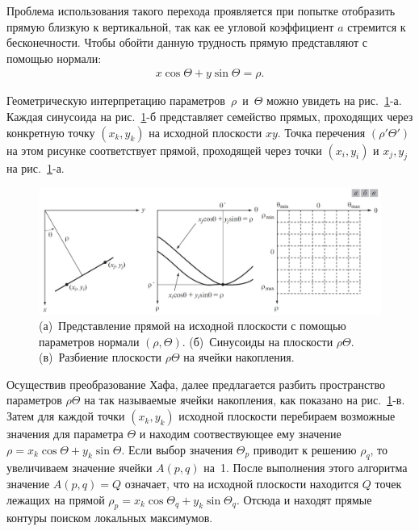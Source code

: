 \documentclass[12pt,a4paper]{article} %
\begin{document}
Проблема использования такого перехода проявляется при попытке отобразить прямую близкую к вертикальной, так как ее угловой коэффициент $a$ стремится к бесконечности. Чтобы обойти данную трудность прямую представляют с помощью нормали:
\begin{gather}\label{norm1}
	x\cos{\Theta} + y\sin{\Theta} = \rho.
\end{gather}

Геометрическую интерпретацию параметров~$\rho$~и~$\Theta$ можно увидеть на рис.~\ref{fig:norm}-а. Каждая синусоида на рис.~\ref{fig:norm}-б представляет семейство прямых, проходящих через конкретную точку $(x_k, y_k)$ на исходной плоскости $xy$. Точка перечения $(\rho'\Theta')$ на этом рисунке соответствует прямой, проходящей через точки $(x_i, y_i)$ и $x_j, y_j$ на рис.~\ref{fig:norm}-а.

\begin{figure}[h]
	
	\centering
	
	\includegraphics[width=0.8\linewidth]{norm.jpg}
	
	\caption{(а)~Представление прямой на исходной плоскости с помощью параметров нормали $(\rho, \Theta)$. 
	(б)~Синусоиды на плоскости $\rho \Theta$.
	(в)~Разбиение плоскости $\rho \Theta$ на ячейки накопления.}
	
	\label{fig:norm}
	
\end{figure}

Осуществив преобразование Хафа, далее предлагается разбить пространство параметров $\rho \Theta$ на так называемые ячейки накопления, как показано на рис.~\ref{fig:norm}-в. Затем для каждой точки $(x_k, y_k)$ исходной плоскости перебираем возможные значения для параметра $\Theta$ и находим соотвествующее ему значение $\rho = x_k\cos{\Theta}+y_k\sin{\Theta}$. Если выбор значения $\Theta_p$ приводит к решению $\rho_q$, то увеличиваем значение ячейки $A(p,q)$ на~1. После выполнения этого алгоритма значение $A(p,q)=Q$ означает, что на исходной плоскости находится $Q$ точек лежащих на прямой $\rho_p = x_k\cos{\Theta_q}+y_k\sin{\Theta_q}$.
Отсюда и находят прямые контуры поиском локальных максимумов. 
\end{document}

